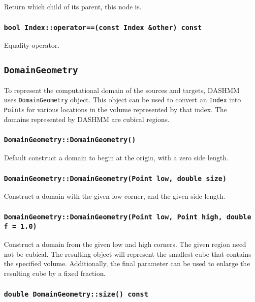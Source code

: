 Return which child of its parent, this node is.

\subsubsection{\texttt{bool Index::operator==(const Index \&other) const}}

Equality operator.


\subsection{\texttt{DomainGeometry}}

To represent the computational domain of the sources and targets, DASHMM
uses \texttt{DomainGeometry} object. This object can be used to convert
an \texttt{Index} into \texttt{Point}s for various locations in the volume
represented by that index. The domains represented by DASHMM are cubical
regions.

\subsubsection{\texttt{DomainGeometry::DomainGeometry()}}

Default construct a domain to begin at the origin, with a zero side length.

\subsubsection{\texttt{DomainGeometry::DomainGeometry(Point low, double size)}}

Construct a domain with the given low corner, and the given side length.

\subsubsection{\texttt{DomainGeometry::DomainGeometry(Point low, Point high, double f = 1.0)}}

Construct a domain from the given low and high corners. The given region need
not be cubical. The resulting object will represent the smallest cube that
contains the specified volume. Additionally, the final parameter can be used
to enlarge the resulting cube by a fixed fraction.

\subsubsection{\texttt{double DomainGeometry::size() const}}

